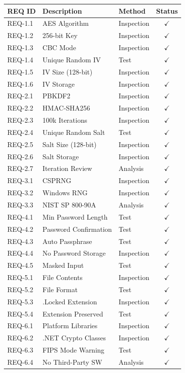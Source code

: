 \documentclass[11pt,letterpaper]{article}
\begin{document}
\small
\begin{longtable}{|l|l|l|c|}
\hline
\textbf{REQ ID} & \textbf{Description} & \textbf{Method} & \textbf{Status} \\
\hline
\endhead

\hline
\endfoot

REQ-1.1 & AES Algorithm & Inspection & $\checkmark$ \\
\hline
REQ-1.2 & 256-bit Key & Inspection & $\checkmark$ \\
\hline
REQ-1.3 & CBC Mode & Inspection & $\checkmark$ \\
\hline
REQ-1.4 & Unique Random IV & Test & $\checkmark$ \\
\hline
REQ-1.5 & IV Size (128-bit) & Inspection & $\checkmark$ \\
\hline
REQ-1.6 & IV Storage & Inspection & $\checkmark$ \\
\hline
REQ-2.1 & PBKDF2 & Inspection & $\checkmark$ \\
\hline
REQ-2.2 & HMAC-SHA256 & Inspection & $\checkmark$ \\
\hline
REQ-2.3 & 100k Iterations & Inspection & $\checkmark$ \\
\hline
REQ-2.4 & Unique Random Salt & Test & $\checkmark$ \\
\hline
REQ-2.5 & Salt Size (128-bit) & Inspection & $\checkmark$ \\
\hline
REQ-2.6 & Salt Storage & Inspection & $\checkmark$ \\
\hline
REQ-2.7 & Iteration Review & Analysis & $\checkmark$ \\
\hline
REQ-3.1 & CSPRNG & Inspection & $\checkmark$ \\
\hline
REQ-3.2 & Windows RNG & Inspection & $\checkmark$ \\
\hline
REQ-3.3 & NIST SP 800-90A & Analysis & $\checkmark$ \\
\hline
REQ-4.1 & Min Password Length & Test & $\checkmark$ \\
\hline
REQ-4.2 & Password Confirmation & Test & $\checkmark$ \\
\hline
REQ-4.3 & Auto Passphrase & Test & $\checkmark$ \\
\hline
REQ-4.4 & No Password Storage & Inspection & $\checkmark$ \\
\hline
REQ-4.5 & Masked Input & Test & $\checkmark$ \\
\hline
REQ-5.1 & File Contents & Inspection & $\checkmark$ \\
\hline
REQ-5.2 & File Format & Test & $\checkmark$ \\
\hline
REQ-5.3 & .Locked Extension & Inspection & $\checkmark$ \\
\hline
REQ-5.4 & Extension Preserved & Test & $\checkmark$ \\
\hline
REQ-6.1 & Platform Libraries & Inspection & $\checkmark$ \\
\hline
REQ-6.2 & .NET Crypto Classes & Inspection & $\checkmark$ \\
\hline
REQ-6.3 & FIPS Mode Warning & Test & $\checkmark$ \\
\hline
REQ-6.4 & No Third-Party SW & Analysis & $\checkmark$ \\
\hline

\end{longtable}
\end{document}
